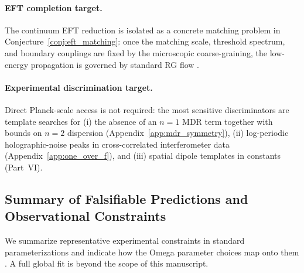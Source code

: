 \paragraph{EFT completion target.}
The continuum EFT reduction is isolated as a concrete matching problem in Conjecture~\ref{conj:eft_matching}: once the matching scale, threshold spectrum, and boundary couplings are fixed by the microscopic coarse-graining, the low-energy propagation is governed by standard RG flow \cite{PeskinSchroeder1995}.

\paragraph{Experimental discrimination target.}
Direct Planck-scale access is not required: the most sensitive discriminators are template searches for (i) the absence of an $n=1$ MDR term together with bounds on $n=2$ dispersion (Appendix~\ref{app:mdr_symmetry}), (ii) log-periodic holographic-noise peaks in cross-correlated interferometer data (Appendix~\ref{app:one_over_f}), and (iii) spatial dipole templates in constants (Part~VI).

\subsection{Summary of Falsifiable Predictions and Observational Constraints}
We summarize representative experimental constraints in standard parameterizations and indicate how the Omega parameter choices map onto them \cite{Mattingly2005,Dodelson2003}. A full global fit is beyond the scope of this manuscript.

